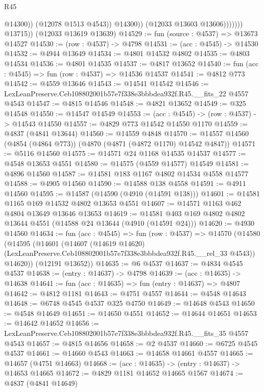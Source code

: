 \begin{lexlean}{R45}
\begin{coremodule}
                              @14300))
                          (@12078 @1513 @4543))
                        @14300))
                    (@12033 @13603 @13606)))))))
        @13715))
    (@12033 @13619 @13639)
@14529 := fun (source : @4537) => @13673 @14527
@14530 := (row : @4537) -> @4798
@14531 := (acc : @4545) -> @14530
@14532 := @4944 @13649
@14534 := @4801 @14532 @4802
@14535 := @4803 @14534
@14536 := @4801 @14535
@14537 := @4817 @13652
@14540 := fun (acc : @4545) => fun (row : @4537) => @14536 @14537
@14541 := @4812 @773
@14542 := @4559 @13646
@14543 := @14541 @14542
@14546 := LexLeanPreserve.Ceb108802001b57e7f338e3bbbdea932f.R45.__fits_22 @4557 @4543
@14547 := @4815 @14546
@14548 := @4821 @13652
@14549 := @325 @14548
@14550 := @14547 @14549
@14553 := (acc : @4545) -> (row : @4537) -> @14543 @14550
@14557 := @4829 @773 @14542 @14550 @1170
@14559 := @4837 (@4841 @13644)
@14560 := @14559 @4848
@14570 := @14557 @14560 (@4854 (@4864 @773)) (@4870 (@4871 (@4872 @1170) @14542 @4847))
@14571 := @5116 @14560
@14575 := @14571 @24 @1168 @14535 @14537
@14577 := @4548 @13653 @4551
@14580 := @14575 (@4559 @14577) @14549
@14581 := @4896 @14560
@14587 := @14581 @183 @1167 @4802 @14534 @4558 @14577
@14588 := @4905 @14560
@14590 := @14588 @138 @4558
@14591 := @4911 @14560
@14595 := @14587 (@14590 (@4910 (@14591 @138)))
@14601 := @14581 @1165 @169 @14532 @4802 @13653 @4551
@14607 := @14571 @1163 @462 @4804 @13649 @13646 @13653
@14619 := @14581 @403 @169 @4802 @4802 @13644 @4551 (@14588 @24 @13644 (@4910 (@14591 @24)))
@14620 := @4930 @14560
@14634 := fun (acc : @4545) =>
  fun (row : @4537) =>
  @14570
    (@14580
      (@14595
        (@14601
          (@14607
            (@14619 @14620)
            (LexLeanPreserve.Ceb108802001b57e7f338e3bbbdea932f.R45.__rel_33 @4543))
          @14620))
      (@12191 @13652))
@14635 := @6 @4537
@14637 := @4834 @4545 @4537
@14638 := (entry : @14637) -> @4798
@14639 := (acc : @14635) -> @14638
@14641 := fun (acc : @14635) => fun (entry : @14637) => @4807
@14642 := @4812 @1181
@14643 := @4751 @4557
@14644 := @4548 @14643
@14648 := @6748 @4545 @4537 @325 @4750
@14649 := @14648 @4543
@14650 := @4548 @14649
@14651 := @14650 @4551
@14652 := @14644 @14651
@14653 := @14642 @14652
@14656 := LexLeanPreserve.Ceb108802001b57e7f338e3bbbdea932f.R45.__fits_35 @4557 @4543
@14657 := @4815 @14656
@14658 := @2 @4537
@14660 := @6725 @4545 @4537
@14661 := @14660 @4543
@14663 := @14658 @14661 @4557
@14665 := @14657 (@4751 @14663)
@14668 := (acc : @14635) -> (entry : @14637) -> @14653 @14665
@14672 := @4829 @1181 @14652 @14665 @1567
@14674 := @4837 (@4841 @14649)

\end{coremodule}
\end{lexlean}
